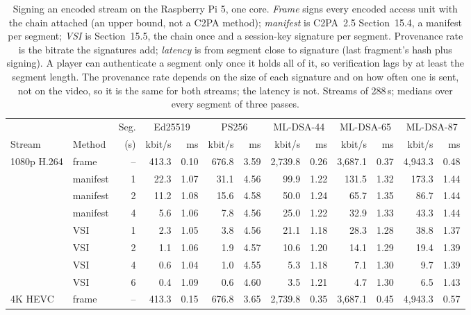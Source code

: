 \begin{table}[t]
\caption{Signing an encoded stream on the Raspberry Pi 5, one core. \emph{Frame} signs every encoded access unit with the chain attached (an upper bound, not a C2PA method); \emph{manifest} is C2PA~2.5 Section~15.4, a manifest per segment; \emph{VSI} is Section~15.5, the chain once and a session-key signature per segment. Provenance rate is the bitrate the signatures add; \emph{latency} is from segment close to signature (last fragment's hash plus signing). A player can authenticate a segment only once it holds all of it, so verification lags by at least the segment length. The provenance rate depends on the size of each signature and on how often one is sent, not on the video, so it is the same for both streams; the latency is not. Streams of 288\,s; medians over every segment of three passes.}
\label{tab:stream}
\small
\setlength{\tabcolsep}{2.9pt}
\begin{tabular}{llrrrrrrrrrrr}
\toprule
 & & Seg. & \multicolumn{2}{c}{Ed25519} & \multicolumn{2}{c}{PS256} & \multicolumn{2}{c}{ML-DSA-44} & \multicolumn{2}{c}{ML-DSA-65} & \multicolumn{2}{c}{ML-DSA-87}\\
\cmidrule(lr){4-5}\cmidrule(lr){6-7}\cmidrule(lr){8-9}\cmidrule(lr){10-11}\cmidrule(lr){12-13}
Stream & Method & (s) & kbit/s & ms & kbit/s & ms & kbit/s & ms & kbit/s & ms & kbit/s & ms\\
\midrule
1080p H.264 & frame & -- & 413.3 & 0.10 & 676.8 & 3.59 & 2,739.8 & 0.26 & 3,687.1 & 0.37 & 4,943.3 & 0.48\\
 & manifest & 1 & 22.3 & 1.07 & 31.1 & 4.56 & 99.9 & 1.22 & 131.5 & 1.32 & 173.3 & 1.44\\
 & manifest & 2 & 11.2 & 1.08 & 15.6 & 4.58 & 50.0 & 1.24 & 65.7 & 1.35 & 86.7 & 1.44\\
 & manifest & 4 & 5.6 & 1.06 & 7.8 & 4.56 & 25.0 & 1.22 & 32.9 & 1.33 & 43.3 & 1.44\\
 & VSI & 1 & 2.3 & 1.05 & 3.8 & 4.56 & 21.1 & 1.18 & 28.3 & 1.28 & 38.8 & 1.37\\
 & VSI & 2 & 1.1 & 1.06 & 1.9 & 4.57 & 10.6 & 1.20 & 14.1 & 1.29 & 19.4 & 1.39\\
 & VSI & 4 & 0.6 & 1.04 & 1.0 & 4.55 & 5.3 & 1.18 & 7.1 & 1.30 & 9.7 & 1.39\\
 & VSI & 6 & 0.4 & 1.09 & 0.6 & 4.60 & 3.5 & 1.21 & 4.7 & 1.30 & 6.5 & 1.43\\
\midrule
4K HEVC & frame & -- & 413.3 & 0.15 & 676.8 & 3.65 & 2,739.8 & 0.35 & 3,687.1 & 0.45 & 4,943.3 & 0.57\\

\end{tabular}
\end{table}
